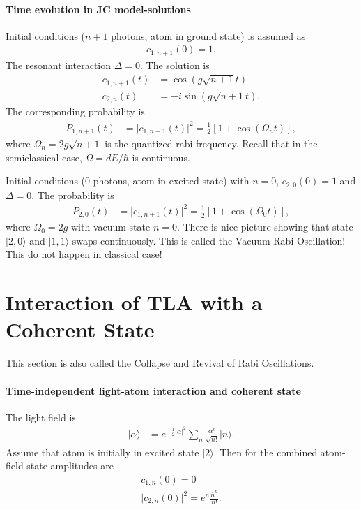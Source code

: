 \documentclass[../../note.tex]{subfiles}
\begin{document}
\paragraph*{Time evolution in JC model-solutions}
Initial conditions ($n+1$ photons, atom in ground state) is assumed as
\begin{align}
    c_{1, n+1}(0) = 1.
\end{align}
The resonant interaction $\Delta = 0$. The solution is
\begin{align}
    c_{1, n+1}(t) 
    &= \cos(g\sqrt{n+1} t) \\
    c_{2, n}(t)
    &= -i \sin(g \sqrt{n+1} t).
\end{align}
The corresponding probability is
\begin{align}
    P_{1, n+1}(t) 
    &= \vert c_{1, n+1}(t) \vert^2 = \frac{1}{2} \left[1+\cos(\Omega_n t)\right],
\end{align}
where $\Omega_{n} = 2 g \sqrt{n+1}$ is the quantized rabi frequency. Recall that in the semiclassical case, $\Omega = {d E}/{\hbar}$ is continuous.

Initial conditions (0 photons, atom in excited state) with $n = 0$, $c_{2,0}(0) = 1$ and $\Delta = 0$. The probability is 
\begin{align}
    P_{2, 0}(t)
    &= \vert c_{1, n+1}(t) \vert^2 = \frac{1}{2} \left[1+\cos(\Omega_0 t)\right],
\end{align}
where $\Omega_0 = 2 g$ with vacuum state $n = 0$. There is nice picture showing that state $\vert 2, 0 \rangle$ and $\vert 1, 1 \rangle$ swaps continuously. This is called the Vacuum Rabi-Oscillation! This do not happen in classical case!

\section{Interaction of TLA with a Coherent State}
This section is also called the Collapse and Revival of Rabi Oscillations.

\paragraph*{Time-independent light-atom interaction and coherent state}
The light field is 
\begin{align}
    \vert \alpha \rangle 
    &= e^{-\frac{1}{2}\vert \alpha \vert^2} \sum_{n} \frac{\alpha^n}{\sqrt{n!}} \vert n \rangle.
\end{align}
Assume that atom is initially in excited state $\vert 2 \rangle$. Then for the combined atom-field state amplitudes are 
\begin{align}
    c_{1,n}(0) = 0 \\
    \vert c_{2, n}(0) \vert^2 = e^{\overline{n}} \frac{\overline{n}^n}{n !}.
\end{align}
\end{document}
